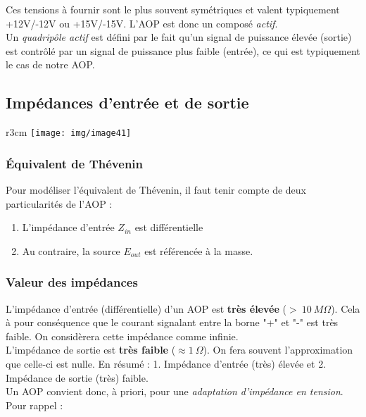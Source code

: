 Ces tensions à fournir sont le plus souvent symétriques et valent typiquement +12V/-12V ou +15V/-15V. L'AOP est donc un composé \textit{actif}.\\

Un \textit{quadripôle actif} est défini par le fait qu'un signal de puissance élevée (sortie) est contrôlé par un signal de puissance plus faible (entrée), ce qui est typiquement le cas de notre AOP.\\




\newpage

\subsection{Impédances d'entrée et de sortie}\begin{wrapfigure}[1]{r}{3cm}
\texttt{[image: img/image41]}
\end{wrapfigure}
\subsubsection{Équivalent de Thévenin}

Pour modéliser l'équivalent de Thévenin, il faut tenir compte de deux particularités de l'AOP :
\begin{enumerate}
\item L'impédance d'entrée $Z_{in}$ est différentielle
\item Au contraire, la source $E_{out}$ est référencée à la masse.
\end{enumerate}


\subsubsection{Valeur des impédances}
L'impédance d'entrée (différentielle) d'un AOP est \textbf{très élevée} ($>\ 10\ M\Omega$). Cela à pour conséquence que le courant signalant entre la borne "+" et "-" est très faible. On considèrera cette impédance comme infinie.\\
L'impédance de sortie est \textbf{très faible} ($\approx 1\ \Omega$). On fera souvent l'approximation que celle-ci est nulle. En résumé : 1. Impédance d'entrée (très) élevée et 2. Impédance de sortie (très) faible.\\
Un AOP convient donc, à priori, pour une \textit{adaptation d'impédance en tension}. Pour rappel :\\

